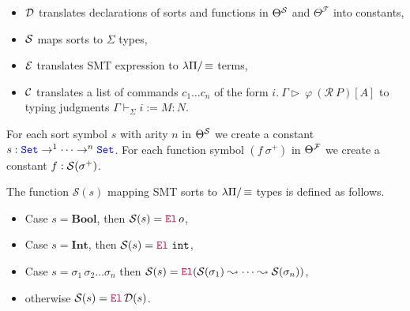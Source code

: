 \begin{itemize}
\item $\cal{D}$ translates declarations of sorts and functions in $\Theta^\cal{S}$ and $\Theta^\mathcal{F}$ into constants,
\item $\cal{S}$ maps sorts to $\Sigma$ types,
\item $\cal{E}$ translates SMT expression to $\lpm$ terms,
\item $\cal{C}$ translates a list of commands  $c_1 \dots c_n$ of the form $i.~\Gamma \triangleright~\varphi~(\mathcal{R}~P)[A]$ to typing judgments $\Gamma \vdash_\Sigma i := M: N$.
\end{itemize}

\begin{definition}%
For each sort symbol $s$ with arity $n$ in $\Theta^\cal{S}$ we create a constant $s: \set \ra^1 \dots \ra^{n} \set$.
For each function symbol $(f~\sigma^+)$ in $\Theta^\cal{F}$ we create a constant $f: \cal{S}(\sigma^+)$.
\end{definition}

\begin{definition}%
  The function $\mathcal{S}(s)$ mapping SMT sorts to $\lpm$ types is defined as follows.
  \begin{itemize}
    \item Case $s = \textbf{Bool}$, then $\Sort{s} = \el\,o$,
    \item Case $s = \textbf{Int}$, then $\Sort{s} = \el~\texttt{int}$,
    \item Case $s = \sigma_1\,\sigma_2 \dots \sigma_n$ then $\Sort{s} = \el{} (\mathcal{S}(\sigma_1) \leadsto \dots \leadsto \mathcal{S}(\sigma_n))$,
    \item otherwise $\Sort{s} = \el\, \mathcal{D}(s)$.
  \end{itemize}
\end{definition}

